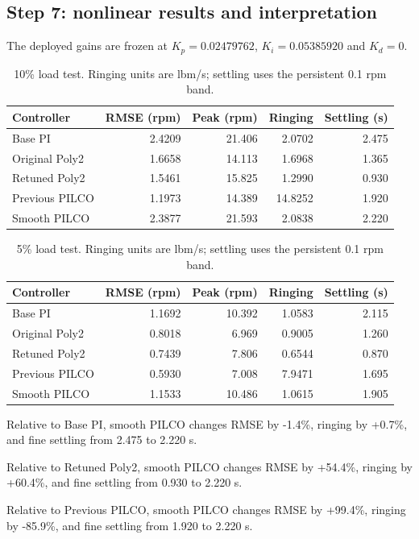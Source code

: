 \subsection{Step 7: nonlinear results and interpretation}
The deployed gains are frozen at $K_p=0.02479762$, $K_i=0.05385920$ and $K_d=0$.
\begin{table}[H]\centering\small\begin{tabular}{lrrrr}\toprule
Controller & RMSE (rpm) & Peak (rpm) & Ringing & Settling (s)\\\midrule
Base PI & 2.4209 & 21.406 & 2.0702 & 2.475\\
Original Poly2 & 1.6658 & 14.113 & 1.6968 & 1.365\\
Retuned Poly2 & 1.5461 & 15.825 & 1.2990 & 0.930\\
Previous PILCO & 1.1973 & 14.389 & 14.8252 & 1.920\\
Smooth PILCO & 2.3877 & 21.593 & 2.0838 & 2.220\\\bottomrule\end{tabular}\caption{10\% load test. Ringing units are lbm/s; settling uses the persistent 0.1 rpm band.}\end{table}
\begin{table}[H]\centering\small\begin{tabular}{lrrrr}\toprule
Controller & RMSE (rpm) & Peak (rpm) & Ringing & Settling (s)\\\midrule
Base PI & 1.1692 & 10.392 & 1.0583 & 2.115\\
Original Poly2 & 0.8018 & 6.969 & 0.9005 & 1.260\\
Retuned Poly2 & 0.7439 & 7.806 & 0.6544 & 0.870\\
Previous PILCO & 0.5930 & 7.008 & 7.9471 & 1.695\\
Smooth PILCO & 1.1533 & 10.486 & 1.0615 & 1.905\\\bottomrule\end{tabular}\caption{5\% load test. Ringing units are lbm/s; settling uses the persistent 0.1 rpm band.}\end{table}
Relative to Base PI, smooth PILCO changes RMSE by -1.4\%, ringing by +0.7\%, and fine settling from 2.475 to 2.220 s.

Relative to Retuned Poly2, smooth PILCO changes RMSE by +54.4\%, ringing by +60.4\%, and fine settling from 0.930 to 2.220 s.

Relative to Previous PILCO, smooth PILCO changes RMSE by +99.4\%, ringing by -85.9\%, and fine settling from 1.920 to 2.220 s.

